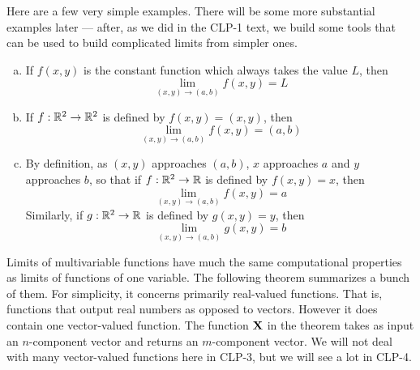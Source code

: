 Here are a few very simple examples. There will be some more substantial examples later --- after, as we did in the CLP-1 text, we build some tools 
that can be used to build complicated limits from simpler ones.
\begin{eg}\label{eg trivial limits}
\begin{enumerate}[(a)]
\item
If $f(x,y)$ is the constant function which always takes the value $L$,
then
\begin{equation*}
\lim_{(x,y)\to(a,b)} f(x,y) = L
\end{equation*}

\item
If $f:\mathbb{R}^2\rightarrow\mathbb{R}^2$ is defined by $f(x,y) = (x,y)$,
then 
\begin{equation*}
\lim_{(x,y)\to(a,b)} f(x,y) = (a,b)
\end{equation*}

\item
By definition, as $(x,y)$ approaches $(a,b)$, $x$ approaches $a$
and $y$ approaches $b$, so that
if $f:\mathbb{R}^2\rightarrow\mathbb{R}$ is defined by $f(x,y) = x$,
then 
\begin{equation*}
\lim_{(x,y)\to(a,b)} f(x,y) = a
\end{equation*}
Similarly, if $g:\mathbb{R}^2\rightarrow\mathbb{R}$ is defined by $g(x,y) = y$,
then 
\begin{equation*}
\lim_{(x,y)\to(a,b)} g(x,y) = b
\end{equation*}

\end{enumerate}

\end{eg}

Limits of multivariable functions have much the same 
computational properties as limits of functions of one variable.
The following theorem summarizes a bunch of them. For simplicity,
it concerns primarily real-valued functions. That is, functions that output
real numbers as opposed to vectors. However it does contain one
vector-valued function. The function $\mathbf{X}$ in the theorem takes as input
an $n$-component vector and returns an $m$-component vector.
We will not deal with many vector-valued functions here in CLP-3,
but we will see a lot in CLP-4.


